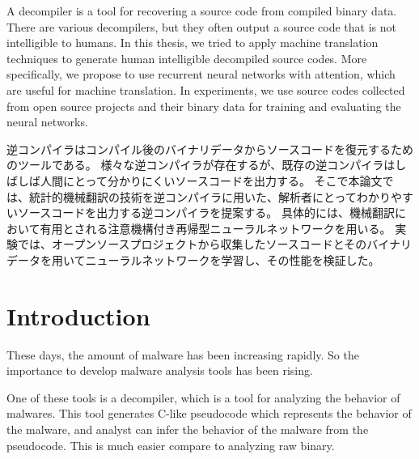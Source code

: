 \documentclass[senior,final,11pt]{iscs-thesis}
\date{December 11, 2018}
\begin{document}
\begin{eabstract}
A decompiler is a tool for recovering a source code from compiled binary data.
There are various decompilers, but they often output a source code that is not intelligible to humans. 
In this thesis, we tried to apply machine translation techniques to generate human intelligible decompiled source codes. 
More specifically, we propose to use recurrent neural networks with attention, which are useful for machine translation. 
In experiments, we use source codes collected from open source projects and their binary data for training and evaluating the neural networks.
\end{eabstract}
\begin{jabstract}
逆コンパイラはコンパイル後のバイナリデータからソースコードを復元するためのツールである。
様々な逆コンパイラが存在するが、既存の逆コンパイラはしばしば人間にとって分かりにくいソースコードを出力する。
そこで本論文では、統計的機械翻訳の技術を逆コンパイラに用いた、解析者にとってわかりやすいソースコードを出力する逆コンパイラを提案する。
具体的には、機械翻訳において有用とされる注意機構付き再帰型ニューラルネットワークを用いる。
実験では、オープンソースプロジェクトから収集したソースコードとそのバイナリデータを用いてニューラルネットワークを学習し、その性能を検証した。
\end{jabstract}

\maketitle

\chapter{Introduction}

These days, the amount of malware has been increasing rapidly.
So the importance to develop malware analysis tools has been rising.

One of these tools is a decompiler, which is a tool for analyzing the behavior of malwares. 
This tool generates C-like pseudocode which represents the behavior of the malware, and analyst can infer the behavior of the malware from the pseudocode.
This is much easier compare to analyzing raw binary. 
\end{document}
